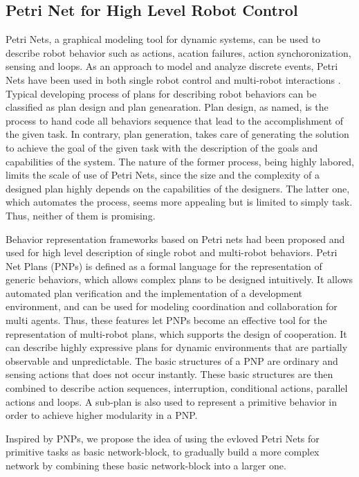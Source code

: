 \documentclass[12pt,a4paper,twocolumn]{article}
\begin{document}
\subsection{Petri Net for High Level Robot Control}

Petri Nets, a graphical modeling tool for dynamic systems, can be used to describe robot behavior such as actions, acation failures, action synchoronization, sensing and loops. As an approach to model and analyze discrete events, Petri Nets have been used in both single robot control \cite{costelha2007modelling} and multi-robot interactions \cite{sheng2005peer}\cite{palamara2009teamwork}. Typical developing process of plans for describing robot behaviors can be classified as plan design and plan genearation. Plan design, as named, is the process to hand code all behaviors sequence that lead to the accomplishment of the given task. In contrary, plan generation, takes care of generating the solution to achieve the goal of the given task with the description of the goals and capabilities of the system. The nature of the former process, being highly labored, limits the scale of use of Petri Nets, since the size and the complexity of a designed plan highly depends on the capabilities of the designers. The latter one, which automates the process, seems more appealing but is limited to simply task. Thus, neither of them is promising. 

Behavior representation frameworks based on Petri nets \cite{ziparo2011petri} had been proposed and used for high level description of single robot and multi-robot behaviors. Petri Net Plans (PNPs) \cite{ziparo2011petri} is defined as a formal language for the representation of generic behaviors, which allows complex plans to be designed intuitively. It allows automated plan verification and the implementation of a development environment, and can be used for modeling coordination and collaboration for multi agents. Thus, these features let PNPs become an effective tool for the representation of multi-robot plans, which supports the design of cooperation. It can describe highly expressive plans for dynamic environments that are partially observable and unpredictable. The basic structures of a PNP are ordinary and sensing actions that does not occur instantly. These basic structures are then combined to describe action sequences, interruption, conditional actions, parallel actions and loops. A sub-plan is also used to represent a primitive behavior in order to achieve higher modularity in a PNP. 

Inspired by PNPs, we propose the idea of using the evloved Petri Nets for primitive tasks as basic network-block, to gradually build a more complex network by combining these basic network-block into a larger one. 
\end{document}
